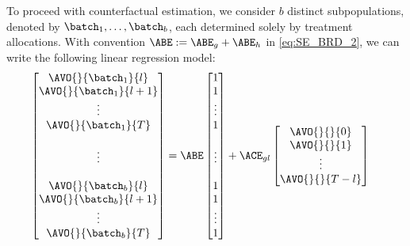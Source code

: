 To proceed with counterfactual estimation, we consider $b$ distinct subpopulations, denoted by $\batch_1, \ldots, \batch_b$, each determined solely by treatment allocations. With convention $\ABE := \ABE_{g} + \ABE_{h}$ in \eqref{eq:SE_BRD_2}, we can write the following linear regression model:
% 
\begin{equation}
    \label{eq:apndx_BRD_model}
    \begin{aligned}
        \begin{bmatrix}
            \AVO{}{\batch_1}{l}
            \\
            \AVO{}{\batch_1}{l+1}
            \\
            \vdots
            \\
            \AVO{}{\batch_1}{T}
            \\
            \\
            \vdots
            \\
            \\
            \AVO{}{\batch_b}{l}
            \\
            \AVO{}{\batch_b}{l+1}
            \\
            \vdots
            \\
            \AVO{}{\batch_b}{T}
        \end{bmatrix}
        =
        \ABE
        \begin{bmatrix}
            1
            \\
            1
            \\
            \vdots
            \\
            1
            \\
            \\
            \vdots
            \\
            \\
            1
            \\
            1
            \\
            \vdots
            \\
            1
        \end{bmatrix}
        &+ \ACE_{gl}
        \begin{bmatrix}
            \AVO{}{}{0}
            \\
            \AVO{}{}{1}
            \\
            \vdots
            \\
            \AVO{}{}{T-l}
            \\

\end{bmatrix}
\end{aligned}
\end{equation}
